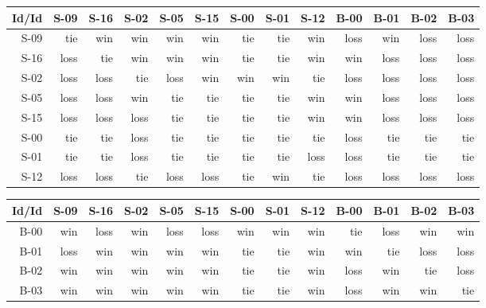 \begin{tabular}{ | r | r | r | r | r | r | r | r | r | r | r | r | r | }
    \hline
        Id/Id  &   S-09  &   S-16  &   S-02  &   S-05  &   S-15  &   S-00  &   S-01  &   S-12  &   B-00  &   B-01  &   B-02  &   B-03  \\
    \hline
    \hline
         S-09  &    tie  &    win  &    win  &    win  &    win  &    tie  &    tie  &    win  &   loss  &    win  &   loss  &   loss  \\
    \hline
         S-16  &   loss  &    tie  &    win  &    win  &    win  &    tie  &    tie  &    win  &    win  &   loss  &   loss  &   loss  \\
    \hline
         S-02  &   loss  &   loss  &    tie  &   loss  &    win  &    win  &    win  &    tie  &   loss  &   loss  &   loss  &   loss  \\
    \hline
         S-05  &   loss  &   loss  &    win  &    tie  &    tie  &    tie  &    tie  &    win  &    win  &   loss  &   loss  &   loss  \\
    \hline
         S-15  &   loss  &   loss  &   loss  &    tie  &    tie  &    tie  &    tie  &    win  &    win  &   loss  &   loss  &   loss  \\
    \hline
         S-00  &    tie  &    tie  &   loss  &    tie  &    tie  &    tie  &    tie  &    tie  &   loss  &    tie  &    tie  &    tie  \\
    \hline
         S-01  &    tie  &    tie  &   loss  &    tie  &    tie  &    tie  &    tie  &   loss  &   loss  &    tie  &    tie  &    tie  \\
    \hline
         S-12  &   loss  &   loss  &    tie  &   loss  &   loss  &    tie  &    win  &    tie  &   loss  &   loss  &   loss  &   loss  \\
    \hline
\end{tabular}


\begin{tabular}{ | r | r | r | r | r | r | r | r | r | r | r | r | r | }
    \hline
        Id/Id  &   S-09  &   S-16  &   S-02  &   S-05  &   S-15  &   S-00  &   S-01  &   S-12  &   B-00  &   B-01  &   B-02  &   B-03  \\
    \hline
    \hline
         B-00  &    win  &   loss  &    win  &   loss  &   loss  &    win  &    win  &    win  &    tie  &   loss  &    win  &    win  \\
    \hline
         B-01  &   loss  &    win  &    win  &    win  &    win  &    tie  &    tie  &    win  &    win  &    tie  &   loss  &   loss  \\
    \hline
         B-02  &    win  &    win  &    win  &    win  &    win  &    tie  &    tie  &    win  &   loss  &    win  &    tie  &   loss  \\
    \hline
         B-03  &    win  &    win  &    win  &    win  &    win  &    tie  &    tie  &    win  &   loss  &    win  &    win  &    tie  \\
    \hline
\end{tabular}


